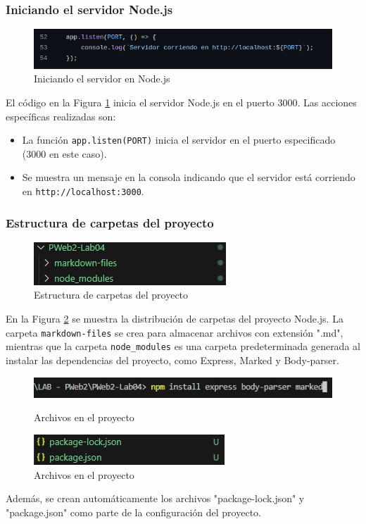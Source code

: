 \documentclass{article}
\begin{document}
\subsubsection{Iniciando el servidor Node.js}
\begin{figure}[h]
    \centering
    \includegraphics[width=0.9\linewidth]{latex//img/3.5.png}
    \caption{Iniciando el servidor en Node.js}
    \label{fig:start-server}
\end{figure}

El código en la Figura \ref{fig:start-server} inicia el servidor Node.js en el puerto 3000. Las acciones específicas realizadas son:
\begin{itemize}
    \item La función \texttt{app.listen(PORT)} inicia el servidor en el puerto especificado (3000 en este caso).
    \item Se muestra un mensaje en la consola indicando que el servidor está corriendo en \texttt{http://localhost:3000}.
\end{itemize}

\subsubsection{Estructura de carpetas del proyecto}
\begin{figure}[h]
    \centering
    \includegraphics[width=0.5\linewidth]{latex//img/3.6.png}
    \caption{Estructura de carpetas del proyecto}
    \label{fig:folder-structure}
\end{figure}

En la Figura \ref{fig:folder-structure} se muestra la distribución de carpetas del proyecto Node.js. La carpeta \texttt{markdown-files} se crea para almacenar archivos con extensión ".md", mientras que la carpeta \texttt{node_modules} es una carpeta predeterminada generada al instalar las dependencias del proyecto, como Express, Marked y Body-parser.

\begin{figure}[h]
    \centering
    \includegraphics[width=0.8\linewidth]{latex//img/3.7.png}
    \caption{Archivos en el proyecto}
    \label{fig:files-in-project-1}
        \includegraphics[width=0.5\linewidth]{latex//img/3.8.png}
    \caption{Archivos en el proyecto}
    \label{fig:files-in-project-2}
\end{figure}
Además, se crean automáticamente los archivos "package-lock.json" y "package.json" como parte de la configuración del proyecto.
\clearpage
\end{document}
